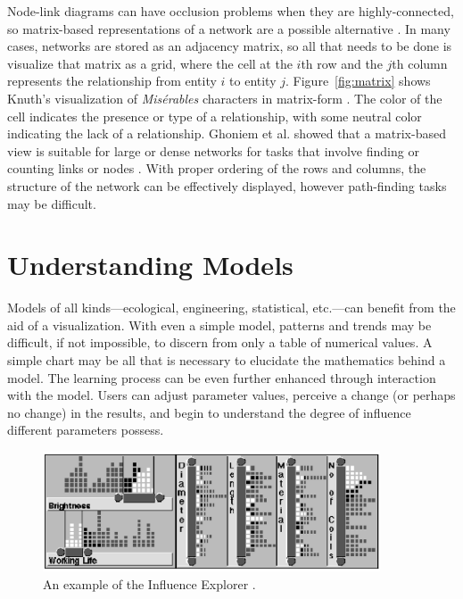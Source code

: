 Node-link diagrams can have occlusion problems when they are highly-connected, so matrix-based representations of a network are a possible alternative \cite{heer2010}.  In many cases, networks are stored as an adjacency matrix, so all that needs to be done is visualize that matrix as a grid, where the cell at the $i$th row and the $j$th column represents the relationship from entity $i$ to entity $j$.  Figure~\ref{fig:matrix} shows Knuth's visualization of \textit{Mis\'erables} characters in matrix-form \cite{knuth1993}.  The color of the cell indicates the presence or type of a relationship, with some neutral color indicating the lack of a relationship.  Ghoniem et al. showed that a matrix-based view is suitable for large or dense networks for tasks that involve finding or counting links or nodes \cite{ghoniem2004}.  With proper ordering of the rows and columns, the structure of the network can be effectively displayed, however path-finding tasks may be difficult.

\section{Understanding Models}

Models of all kinds---ecological, engineering, statistical, etc.---can benefit from the aid of a visualization.  With even a simple model, patterns and trends may be difficult, if not impossible, to discern from only a table of numerical values.  A simple chart may be all that is necessary to elucidate the mathematics behind a model.  The learning process can be even further enhanced through interaction with the model.  Users can adjust parameter values, perceive a change (or perhaps no change) in the results, and begin to understand the degree of influence different parameters possess.

\begin{figure}[h]
	\centering
	\includegraphics[width=10cm]{figures/eps/influenceExplorer.eps}
	\caption{An example of the Influence Explorer \cite{tweedie1995}.}
	\label{fig:influenceExplorer}
\end{figure}


